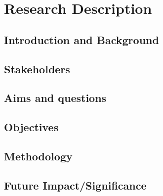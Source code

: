 \chapter{Research Description}\label{ch:Intro}

\section{Introduction and Background}\label{sec:disBackground} 


\section{Stakeholders}\label{sec:disDyskrholders} 


\section{Aims and questions}\label{sec:disAims} 


\section{Objectives}\label{sec:disObjectives} 


\section{Methodology}\label{sec:disMethodology} 


\section{Future Impact/Significance}\label{sec:disFutureImpact} 


%











